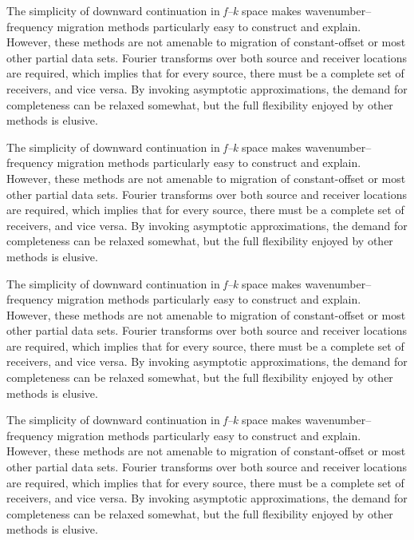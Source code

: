 \begin{framed}
\noindent The simplicity of downward continuation in \textit{f--k} space makes wavenumber--frequency migration methods particularly easy to construct and explain.
However, these methods are not amenable to migration of constant-offset or most other partial data sets. Fourier transforms over both source
and receiver locations are required, which implies that for every source, there must be a complete set of receivers, and vice versa. By invoking
asymptotic approximations, the demand for completeness can be relaxed somewhat, but the full flexibility enjoyed by other methods is elusive.

The simplicity of downward continuation in \textit{f--k} space makes wavenumber--frequency migration methods particularly easy to construct and explain.
However, these methods are not amenable to migration of constant-offset or most other partial data sets. Fourier transforms over both source
and receiver locations are required, which implies that for every source, there must be a complete set of receivers, and vice versa. By invoking
asymptotic approximations, the demand for completeness can be relaxed somewhat, but the full flexibility enjoyed by other methods is elusive.

The simplicity of downward continuation in \textit{f--k} space makes wavenumber--frequency migration methods particularly easy to construct and explain.
However, these methods are not amenable to migration of constant-offset or most other partial data sets. Fourier transforms over both source
and receiver locations are required, which implies that for every source, there must be a complete set of receivers, and vice versa. By invoking
asymptotic approximations, the demand for completeness can be relaxed somewhat, but the full flexibility enjoyed by other methods is elusive.

The simplicity of downward continuation in \textit{f--k} space makes wavenumber--frequency migration methods particularly easy to construct and explain.
However, these methods are not amenable to migration of constant-offset or most other partial data sets. Fourier transforms over both source
and receiver locations are required, which implies that for every source, there must be a complete set of receivers, and vice versa. By invoking
asymptotic approximations, the demand for completeness can be relaxed somewhat, but the full flexibility enjoyed by other methods is elusive.
\end{framed}

